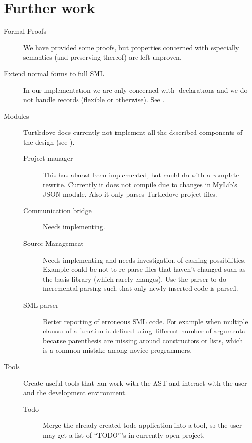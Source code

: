 \section{Further work}
\label{sec:further-work}
\begin{description}
\item[Formal Proofs] We have provided some proofs, but properties concerned with
  especially semantics (and preserving thereof) are left unproven.

\item[Extend normal forms to full SML] In our implementation we are only concerned
  with -declarations and we do not handle records (flexible or
  otherwise). See .

\item[Modules] Turtledove does currently not implement all the described
  components of the design (see ). 
  \begin{description}
  \item[Project manager] This has almost been implemented, but could do with a
    complete rewrite. Currently it does not compile due to changes in MyLib's
    JSON module. Also it only parses Turtledove project files.

  \item[Communication bridge] Needs implementing.

  \item[Source Management] Needs implementing and needs investigation of cashing
    possibilities. Example could be not to re-parse files that haven't changed
    such as the basis library (which rarely changes). Use the parser to do
    incremental parsing such that only newly inserted code is parsed.

  \item[SML parser] Better reporting of erroneous SML code. For example when
    multiple clauses of a function is defined using different number of
    arguments because parenthesis are missing around constructors or lists,
    which is a common mistake among novice programmers.
  \end{description}

\item[Tools] Create useful tools that can work with the AST and interact with
  the user and the development environment.

  \begin{description}
  \item[Todo] Merge the already created todo application into a tool, so the
    user may get a list of ``TODO'''s in currently open project.


\end{description}
\end{description}

